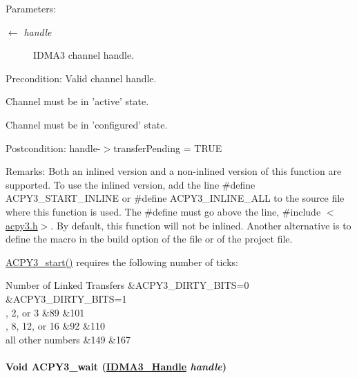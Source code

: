 \begin{Desc}
\item[Parameters:]
\begin{description}
\item[\mbox{$\leftarrow$} {\em handle}]IDMA3 channel handle.\end{description}
\end{Desc}
\begin{Desc}
\item[Precondition:]Valid channel handle. 

Channel must be in 'active' state. 

Channel must be in 'configured' state.\end{Desc}
\begin{Desc}
\item[Postcondition:]handle-$>$transfer\-Pending = TRUE\end{Desc}
\begin{Desc}
\item[Remarks:]Both an inlined version and a non-inlined version of this function are supported. To use the inlined version, add the line \#define ACPY3\_\-START\_\-INLINE or \#define ACPY3\_\-INLINE\_\-ALL to the source file where this function is used. The \#define must go above the line, \#include $<$\hyperlink{acpy3_8h}{acpy3.h}$>$. By default, this function will not be inlined. Another alternative is to define the macro in the build option of the file or of the project file.

\hyperlink{group___d_s_p_a_c_p_y3_gb4102200f00a9df3961a8374c0042bed}{ACPY3\_\-start()} requires the following number of ticks: \begin{TabularC}{3}
\hline
Number of Linked Transfers &ACPY3\_\-DIRTY\_\-BITS=0 &ACPY3\_\-DIRTY\_\-BITS=1  \\, 2, or 3 &89 &101  \\, 8, 12, or 16 &92 &110  \\\hline
all other numbers &149 &167  \\\hline
\end{TabularC}
\end{Desc}
\hypertarget{group___d_s_p_a_c_p_y3_g499bc0643a52f5cfd0828c1ce21cd69b}{
\paragraph[ACPY3\_\-wait]{\setlength{\rightskip}{0pt plus 5cm}Void ACPY3\_\-wait (\hyperlink{struct_i_d_m_a3___obj}{IDMA3\_\-Handle} {\em handle})}\hfill}
\label{group___d_s_p_a_c_p_y3_g499bc0643a52f5cfd0828c1ce21cd69b}


